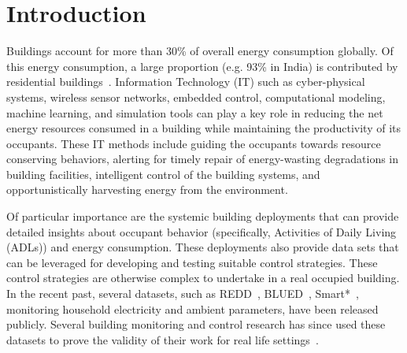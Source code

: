 \documentclass[10pt]{sensys-proc}
\begin{document}
\section{Introduction}
\label{sec:intro}
 Buildings account for more than 30\% of overall energy consumption globally. %
Of this energy consumption, a large proportion (e.g. 93\% in India) is contributed by residential buildings~\cite{evans09india}. %
Information Technology (IT) such as cyber-physical systems, wireless sensor networks, embedded control, computational modeling, machine learning, and simulation tools can play a key role in reducing the net energy resources consumed in a building while maintaining the productivity of its occupants. These IT methods include guiding the occupants towards resource conserving behaviors, alerting for timely repair of energy-wasting degradations in building facilities, intelligent control of the building systems, and opportunistically harvesting energy from the environment.
 
 Of particular importance are the systemic building deployments that can provide detailed insights about occupant behavior (specifically, Activities of Daily Living (ADLs)) and energy consumption. These deployments also provide data sets that can be leveraged for developing and testing suitable control strategies. These control strategies are otherwise complex to undertake in a real occupied building. In the recent past, several datasets, such as REDD~\cite{redd}, BLUED~\cite{blued_cmu}, Smart*~\cite{smart}, monitoring household electricity and ambient parameters, have been released publicly. Several building monitoring and control research has since used these datasets to prove the validity of their work for real life settings~\cite{parson2012_aaai,smartcap}.  
\end{document}
